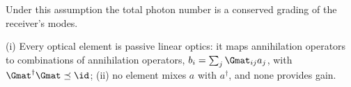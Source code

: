 
Under this assumption the total photon number is a conserved grading of the
receiver's modes.

\begin{assumption}\label{ass:passive}
(i) Every optical element is passive linear optics: it maps annihilation
operators to combinations of annihilation operators,
$b_i=\sum_j\Gmat_{ij}a_j$, with $\Gmat^\dagger\Gmat\preceq\id$;
(ii) no element mixes $a$ with $a^\dagger$, and none provides gain.
\end{assumption}
